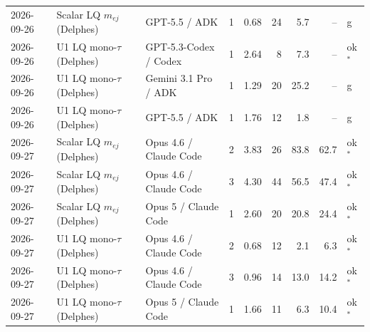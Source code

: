\begin{longtable}{llllrrrrl}
2026-09-26 & Scalar LQ $m_{ej}$ (Delphes) & GPT-5.5 / ADK & 1 & 0.68 & 24 & 5.7 & -- & g \\
2026-09-26 & U1 LQ mono-$\tau$ (Delphes) & GPT-5.3-Codex / Codex & 1 & 2.64 & 8 & 7.3 & -- & ok$^{*}$ \\
2026-09-26 & U1 LQ mono-$\tau$ (Delphes) & Gemini 3.1 Pro / ADK & 1 & 1.29 & 20 & 25.2 & -- & g \\
2026-09-26 & U1 LQ mono-$\tau$ (Delphes) & GPT-5.5 / ADK & 1 & 1.76 & 12 & 1.8 & -- & g \\
2026-09-27 & Scalar LQ $m_{ej}$ (Delphes) & Opus 4.6 / Claude Code & 2 & 3.83 & 26 & 83.8 & 62.7 & ok$^{*}$ \\
2026-09-27 & Scalar LQ $m_{ej}$ (Delphes) & Opus 4.6 / Claude Code & 3 & 4.30 & 44 & 56.5 & 47.4 & ok$^{*}$ \\
2026-09-27 & Scalar LQ $m_{ej}$ (Delphes) & Opus 5 / Claude Code & 1 & 2.60 & 20 & 20.8 & 24.4 & ok$^{*}$ \\
2026-09-27 & U1 LQ mono-$\tau$ (Delphes) & Opus 4.6 / Claude Code & 2 & 0.68 & 12 & 2.1 & 6.3 & ok$^{*}$ \\
2026-09-27 & U1 LQ mono-$\tau$ (Delphes) & Opus 4.6 / Claude Code & 3 & 0.96 & 14 & 13.0 & 14.2 & ok$^{*}$ \\
2026-09-27 & U1 LQ mono-$\tau$ (Delphes) & Opus 5 / Claude Code & 1 & 1.66 & 11 & 6.3 & 10.4 & ok$^{*}$ \\
\bottomrule
\end{longtable}
